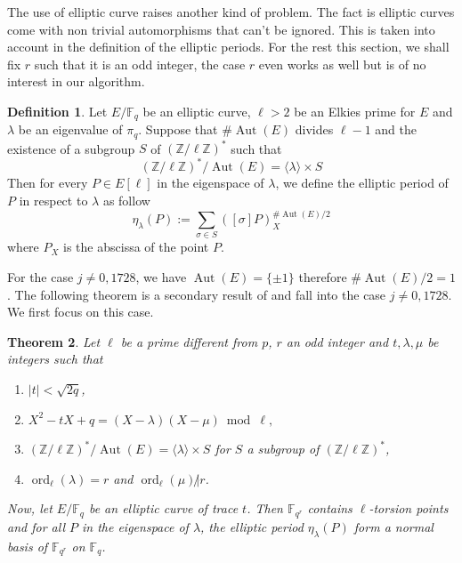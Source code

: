 \documentclass[12pt]{article}
\theoremstyle{plain}
\newtheorem{theorem}{Theorem}
\theoremstyle{definition}
\newtheorem{definition}[theorem]{Definition}
\DeclareMathOperator{\order}{ord} %
\DeclareMathOperator{\Aut}{Aut}
\def\Z{\ensuremath{\mathbb{Z}}}
\def\F{\ensuremath{\mathbb{F}}}
\newcounter{algorithm}
\begin{document}
The use of elliptic curve raises another kind of problem. The fact is elliptic 
curves come with non trivial automorphisms that can't be ignored. This is 
taken into account in the definition of the elliptic periods. For the rest this
section, we shall fix $r$ such that it is an odd integer, the case $r$ even
works as well but is of no interest in our algorithm.

\begin{definition}
\label{definition:ellperiod}
Let $E/\F_q$ be an elliptic curve, $\ell>2$ be an Elkies prime for $E$ and 
$\lambda$ be an eigenvalue of $\pi_q$. Suppose that $\#\Aut(E)$ divides $\ell -
1$ and the existence of a subgroup $S$ of $(\Z/\ell\Z)^{\ast}$ such that 
\begin{equation}
(\Z/\ell\Z)^{\ast}/\Aut(E)=\langle{\lambda}\rangle\times S
\end{equation}
Then for every $P\in E[\ell]$ in the eigenspace of $\lambda$, we define the
elliptic period of $P$ in respect to $\lambda$ as follow
\begin{equation}
\eta_{\lambda}(P) := \sum_{\sigma\in S}{\left([\sigma]P\right)_X^{\#\Aut(E)/2}}
\end{equation}
where $P_X$ is the abscissa of the point $P$.

\end{definition}

For the case $j\neq0,1728$, we have $\Aut(E)=\lbrace{\pm1}\rbrace$ therefore
$\#\Aut(E)/2 = 1$. The following theorem is a secondary result of
\cite{MiMoScho} and fall into the case $j\neq0,1728$. We first focus on
this case.

\begin{theorem}
\label{theorem:ellperiods}
Let $\ell$ be a prime different from $p$, $r$ an odd integer and $t, \lambda,
\mu$ be integers such that 
\begin{enumerate}
    \item $\mid t\mid < \sqrt{2q}$,
    \item $X^2 - tX + q = (X - \lambda)(X - \mu)\bmod \ell,$
    \item $(\Z/\ell\Z)^{\ast}/\Aut(E) = \langle{\lambda}\rangle \times S$ for $S$ a subgroup of
$(\Z/\ell\Z)^{\ast}$,
    \item $\order_\ell(\lambda) = r$ and $\order_\ell(\mu)\not|r$.
\end{enumerate}
Now, let $E/\F_q$ be an elliptic curve of trace $t$. Then $\F_{q^r}$ contains 
$\ell$-torsion points and for all $P$ in the eigenspace of $\lambda$, the elliptic 
period $\eta_\lambda(P)$ form a normal basis of $\F_{q^r}$ on $\F_q$.
\end{theorem}
\end{document}
